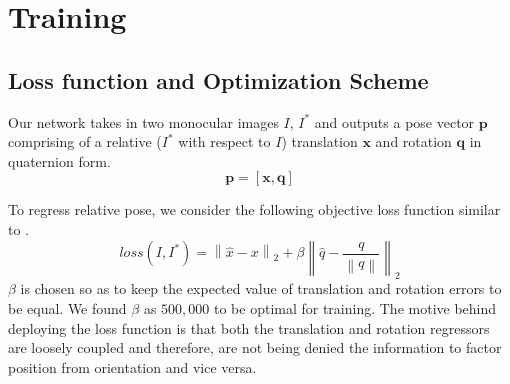 \documentclass[usletter, 10 pt, conference]{ieeeconf}  %
\begin{document}
\section{Training}

\subsection{Loss function and Optimization Scheme}
Our network takes in two monocular images $I$, $I^*$ and outputs a pose vector $\textbf{p}$ comprising of a relative ($I^*$ with respect to $I$) translation $\textbf{x}$ and rotation $\textbf{q}$ in quaternion form. 
\begin{equation}
\mathbf{p=[x,q]}
\end{equation}
 

To regress relative pose, we consider the following objective loss function similar to \cite{kendall2015posenet}.
\begin{equation}
loss(I,I^*)= \left \| \hat{x}-x \right \|_{2} +\beta  \left \| \hat{q}-\frac{q}{\left \| q \right \|} \right \|_{2}
\end{equation}
$\beta$ is chosen so as to keep the expected value of translation and rotation errors to be equal. We found $\beta$ as $500,000$ to be optimal for training. The motive behind deploying the loss function is that both the translation and rotation regressors are loosely coupled and therefore, are not being denied the information to factor position from orientation and vice versa.
\end{document}
